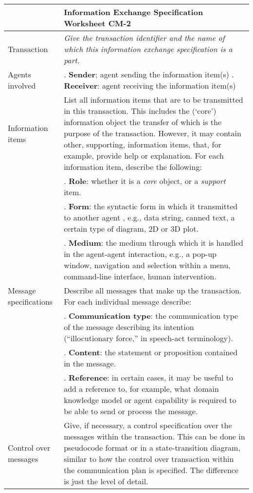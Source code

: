 \begin{tabular}{ %
       |>{\colleft}p{3cm}%
       |>{\colleft}p{8.5cm}|}
\hline
{\bf Communication model} &
   {\bf Information Exchange Specification Worksheet CM-2} \\
\hline
\hline
\sc Transaction &
   {\em
   Give the transaction identifier and the name of which this information
   exchange specification is a part.
   } \\
\hline
\sc Agents involved &
1. {\bf Sender}; agent sending the information item(s)
\newline
2. {\bf Receiver}: agent receiving the information item(s)
\\
\hline
\sc Information items &
   List all information items that are to be transmitted in this
   transaction. This includes the (`core') information object the
   transfer of which is the purpose of the transaction. However, it may contain
   other, supporting, information items, that, for example, provide help
   or explanation. For each information item, describe the following:
   \\
&  1. {\bf Role}: whether it is a {\em core} object, or a {\em
      support} item.
   \\
&  2. {\bf Form}: the syntactic form in which it transmitted to
      another agent , e.g., data string, canned text, a certain type of
      diagram, 2D or 3D plot.
   \\
&  3. {\bf Medium}: the medium through which it is handled in the
      agent-agent interaction, e.g., a pop-up window, navigation and
      selection within a menu, command-line interface, human
      intervention.
   \\
\hline
\sc Message specifications &
   Describe all messages that make up the transaction. For each
   individual message describe:
   \\
&  1. {\bf Communication type}: the communication type of the
      message describing its intention (``illocutionary force,'' in
      speech-act terminology). 
   \\
&  2. {\bf Content}: the statement or proposition contained in the
      message.
   \\
&  3. {\bf Reference}: in certain cases, it may be useful to add
      a reference to, for example, what domain knowledge model or
      agent capability is required to be able to send or process the
      message.
   \\
\hline
\sc Control over messages &
   Give, if necessary, a control specification over the messages
   within the transaction. This can be done in pseudocode format or
   in a state-transition diagram, similar to how the control over
   transaction within the communication plan is specified. The
   difference is just the level of detail.
   \\
\hline
\end{tabular}
